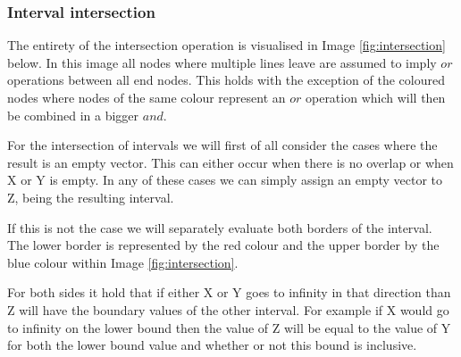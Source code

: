 \documentclass[12pt]{article}
\begin{document}
\subsubsection{Interval intersection}
The entirety of the intersection operation is visualised in Image \ref{fig:intersection} below. In this image all nodes where multiple lines leave are assumed to imply $or$ operations between all end nodes. This holds with the exception of the coloured nodes where nodes of the same colour represent an $or$ operation which will then be combined in a bigger $and$.

For the intersection of intervals we will first of all consider the cases where the result is an empty vector. This can either occur when there is no overlap or when X or Y is empty. In any of these cases we can simply assign an empty vector to Z, being the resulting interval.

If this is not the case we will separately evaluate both borders of the interval. The lower border is represented by the red colour and the upper border by the blue colour within Image \ref{fig:intersection}. 

For both sides it hold that if either X or Y goes to infinity in that direction than Z will have the boundary values of the other interval. For example if X would go to infinity on the lower bound then the value of Z will be equal to the value of Y for both the lower bound value and whether or not this bound is inclusive.
\end{document}
